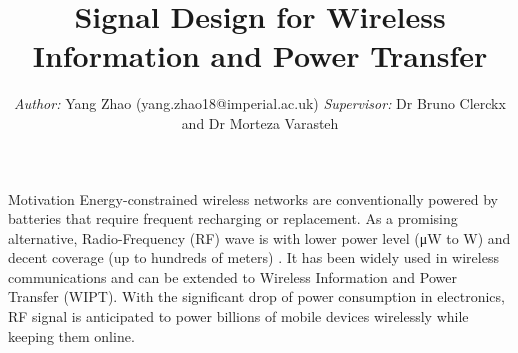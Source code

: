 \documentclass[xcolor={table}]{beamer}
\title{Signal Design for Wireless Information and Power Transfer}
\author{\textit{Author:} Yang Zhao (yang.zhao18@imperial.ac.uk) \quad \textit{Supervisor:} Dr Bruno Clerckx and Dr Morteza Varasteh}
\begin{document}
\begin{frame}[fragile=singleslide,t]\centering

\maketitle


\begin{block}{Motivation}
Energy-constrained wireless networks are conventionally powered by batteries that require frequent recharging or replacement. As a promising alternative, Radio-Frequency (RF) wave is with lower power level (\si{\uW} to \si{W}) and decent coverage (up to hundreds of meters) \citep{Ng2019}. It has been widely used in wireless communications and can be extended to Wireless Information and Power Transfer (WIPT). With the significant drop of power consumption in electronics, RF signal is anticipated to power billions of mobile devices wirelessly while keeping them online.
\end{block}

\begin{columns}[onlytextwidth,T]

\begin{column}{.47\textwidth}


\end{column}
\end{columns}
\end{frame}
\end{document}
